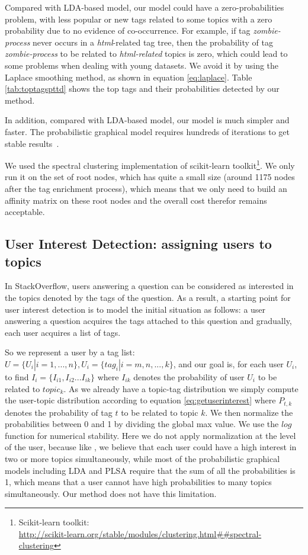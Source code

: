 Compared with LDA-based model, our model could have a zero-probabilities problem, with less popular or new tags related to some topics with a zero probability due to no evidence of co-occurrence. For example, if tag \textit{zombie-process} never occurs in a \textit{html}-related tag tree, then the probability of tag \textit{zombie-process} to be related to \textit{html-related} topics is zero, which could lead to some problems when dealing with young datasets. We avoid it by using the Laplace smoothing method, as shown in equation \ref{eq:laplace}. Table \ref{tab:toptagspttd} shows the top tags and their probabilities detected by our method.


In addition, compared with LDA-based model, our model is much simpler and faster. The probabilistic graphical model requires hundreds of iterations to get stable results~\cite{griffiths2004finding}.

We used the spectral clustering implementation of scikit-learn toolkit\footnote{Scikit-learn toolkit: \\ \indent \url{http://scikit-learn.org/stable/modules/clustering.html##spectral-clustering}}. We only run it on the set of root nodes, which has quite a small size (around 1175 nodes after the tag enrichment process), which means that we only need to build an affinity matrix on these root nodes and the overall cost therefor remains acceptable.

\subsection{User Interest Detection: assigning users to topics}
\label{sec:uidetect}
In StackOverflow, users answering a question can be considered as interested in the topics denoted by the tags of the question. As a result, a starting point for user interest detection is to model the initial situation as follows: a user answering a question acquires the tags attached to this question and gradually, each user acquires a list of tags.

So we represent a user by a tag list: $U= \{U_i | i=1,...,n\},U_i=\{tag_i|i=m,n,...,k\}$, and our goal is, for each user $U_i$, to find $I_i=\{I_{i1},I_{i2}...I_{ik}\}$ where $I_{ik}$ denotes the probability of user $U_i$ to be related to $topic_k$. As we already have a topic-tag distribution %
we simply compute the user-topic distribution according to equation \ref{eq:getuserinterest} where $P_{t,k}$ denotes the probability of tag $t$ to be related to topic $k$. We then normalize the probabilities between 0 and 1 by dividing the global max value. We use the $log$ function for numerical stability. Here we do not apply normalization at the level of the user, because like \cite{yang2013community}, we believe that each user could have a high interest in two or more topics simultaneously, while most of the probabilistic graphical models including LDA and PLSA require that the sum of all the probabilities is 1, which means that a user cannot have high probabilities to many topics simultaneously. Our method does not have this limitation. 


